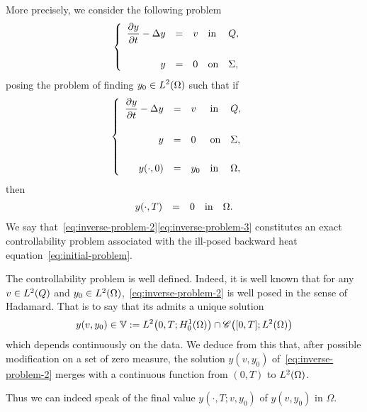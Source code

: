 More precisely, we consider the following problem
\begin{equation*}\label{eq:inverse-problem-1}
    \begin{cases}\displaystyle
        \begin{array}{rclll}
            \dfrac{\partial{}y}{\partial{}t} - \Delta y & = & v & \text{in} & Q,\\
            \\
            y & = & 0 & \text{on} & \Sigma,
        \end{array}
    \end{cases}
\end{equation*}
posing the problem of finding $\displaystyle y_{0}\in L^{2}\!\left({\Omega}\right)$ such
that if
\begin{equation}\label{eq:inverse-problem-2}
    \begin{cases}\displaystyle
        \begin{array}{rclll}
            \dfrac{\partial{}y}{\partial{}t} - \Delta y & = & v & \text{in} & Q,\\
            \\
            y & = & 0 & \text{on} & \Sigma,\\
            \\
            {y}\!\left({\cdot, 0}\right) & = & y_{0} & \text{in} & \Omega,
        \end{array}
    \end{cases}
\end{equation}
then
\begin{equation}\label{eq:inverse-problem-3}
    \begin{array}{rclll}
        {y}\!\left({\cdot,T}\right) & = & 0 & \text{in} & \Omega.
    \end{array}
\end{equation}
We say that~\eqref{eq:inverse-problem-2}\eqref{eq:inverse-problem-3}
constitutes an exact controllability problem associated with the ill-posed
backward heat equation~\eqref{eq:initial-problem}.

\begin{remarque}%
    The controllability problem is well defined. Indeed, it is well known
    that for any $v\in L^{2}\!\left({Q}\right)$ and
    $y_{0}\in L^{2}\!\left({\Omega}\right)$,~\eqref{eq:inverse-problem-2} is well posed in
    the sense of Hadamard. That is to say that its admits a unique solution
    \begin{equation*}\label{eq:well-posedness-heat-equation}
        y\!\left({v,y_{0}}\right)\in \mathbb{V} := L^{2}\!\left({0,T;
        H_{0}^{1}(\Omega)}\right)\cap \mathscr{C}\!\left({[0,T];L^{2}\!\left({\Omega}\right)}\right)
    \end{equation*}
    which depends continuously on the data. We deduce from this that, after
    possible modification on a set of zero measure, the solution
    $y\!\left({v,y_{0}}\right)$ of~\eqref{eq:inverse-problem-2} merges with
    a continuous function from $(0,T)$ to $L^{2}\!\left({\Omega}\right)$.

    Thus we can indeed speak of the final value
    $y\!\left({\cdot,T;v,y_{0}}\right)$ of $y\!\left({v,y_{0}}\right)$ in
    $\Omega$.
\end{remarque}

